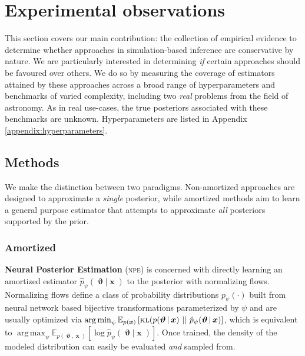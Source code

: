 \documentclass[twoside]{article}
\DeclareMathOperator*{\argmax}{arg\,max}
\DeclareMathOperator*{\argmin}{arg\,min}
\DeclareMathOperator{\vtheta}{\boldsymbol\vartheta}
\DeclareMathOperator{\vx}{\boldsymbol x}
\newcommand{\npe}{\textsc{npe}}
\begin{document}
\section{Experimental observations}
\label{sec:experiments}
This section covers our main contribution: the collection of empirical evidence to determine whether approaches in simulation-based inference are conservative by nature.
We are particularly interested in determining \emph{if} certain approaches should be
favoured over others. We do so by measuring the coverage of estimators attained by these approaches across a broad range of hyperparameters and benchmarks of varied complexity, including two \emph{real} problems from the field of astronomy.
As in real use-cases, the true posteriors associated with these benchmarks are unknown.
Hyperparameters are listed in Appendix \ref{appendix:hyperparameters}.
\subsection{Methods}
\label{sec:methods}
We make the distinction between two paradigms.
Non-amortized approaches are designed to approximate a \emph{single} posterior, while amortized methods aim to learn a general purpose estimator that attempts to approximate \emph{all} posteriors supported by the prior.
\subsubsection{Amortized}
{\bf Neural Posterior Estimation} (\npe) is concerned with directly learning an amortized estimator $\hat{p}_\psi(\vtheta\vert \vx)$ to the posterior with normalizing flows. Normalizing flows define a class of probability distributions $p_\psi(\cdot)$ built from neural network based bijective transformations \citep{dinh2014nice,dinh2016density} parameterized by $\psi$ and are usually optimized via
$\argmin_\psi \mathbb{E}_{p(\vx)} \left[\textsc{kl}(p(\vtheta|\vx)~\vert\vert ~\hat{p}_\psi(\vtheta|\vx)\right]$,
which is equivalent to $\argmax_\psi \mathbb{E}_{p(\vtheta,\vx)}\left[\log \hat{p}_\psi(\vtheta|\vx)\right]$.
Once trained, the density of the modeled distribution can easily be evaluated \emph{and} sampled from.
\end{document}
